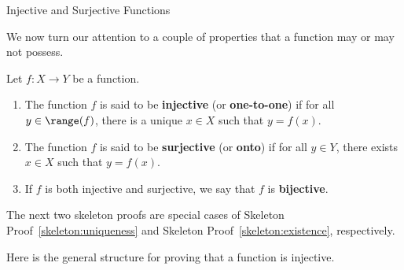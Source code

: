 \begin{section}{Injective and Surjective Functions}

We now turn our attention to a couple of properties that a function may or may not possess.

\begin{definition}
Let $f:X\to Y$ be a function.
\begin{enumerate}[label=\textrm{(\alph*)}]
\item The function $f$ is said to be \textbf{injective} (or \textbf{one-to-one}) if for all $y\in \range(f)$, there is a unique $x\in X$ such that $y=f(x)$.
\item The function $f$ is said to be \textbf{surjective} (or \textbf{onto}) if for all $y\in Y$, there exists $x\in X$ such that $y=f(x)$.
\item If $f$ is both injective and surjective, we say that $f$ is \textbf{bijective}.
\end{enumerate}
\end{definition}



The next two skeleton proofs are special cases of Skeleton Proof~\ref{skeleton:uniqueness} and Skeleton Proof~\ref{skeleton:existence}, respectively.

\begin{skeleton}
Here is the general structure for proving that a function is injective.
\begin{center}
\end{center}
\end{skeleton}


\end{section}
